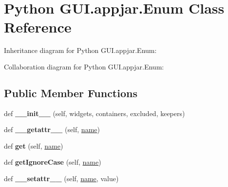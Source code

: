 \hypertarget{class_python_01_g_u_i_1_1appjar_1_1_enum}{}\section{Python G\+U\+I.\+appjar.\+Enum Class Reference}
\label{class_python_01_g_u_i_1_1appjar_1_1_enum}


Inheritance diagram for Python G\+U\+I.\+appjar.\+Enum\+:


Collaboration diagram for Python G\+U\+I.\+appjar.\+Enum\+:
\subsection*{Public Member Functions}
\begin{DoxyCompactItemize}
\item 
\mbox{\label{class_python_01_g_u_i_1_1appjar_1_1_enum_a0cd33a72c16b6d68471f55c382edd94d}} 
def {\bfseries \+\_\+\+\_\+init\+\_\+\+\_\+} (self, widgets, containers, excluded, keepers)
\item 
\mbox{\label{class_python_01_g_u_i_1_1appjar_1_1_enum_ae4a3d992ee00309f0f13fff623215ea0}} 
def {\bfseries \+\_\+\+\_\+getattr\+\_\+\+\_\+} (self, \hyperlink{class_python_01_g_u_i_1_1appjar_1_1_enum_a272c5483812543eeffcb4ab15822a467}{name})
\item 
\mbox{\label{class_python_01_g_u_i_1_1appjar_1_1_enum_a3652f593bd052b6699ebc9715b37d047}} 
def {\bfseries get} (self, \hyperlink{class_python_01_g_u_i_1_1appjar_1_1_enum_a272c5483812543eeffcb4ab15822a467}{name})
\item 
\mbox{\label{class_python_01_g_u_i_1_1appjar_1_1_enum_ae332fc6037fe96886585f856ace527d2}} 
def {\bfseries get\+Ignore\+Case} (self, \hyperlink{class_python_01_g_u_i_1_1appjar_1_1_enum_a272c5483812543eeffcb4ab15822a467}{name})
\item 
\mbox{\label{class_python_01_g_u_i_1_1appjar_1_1_enum_af3eaf04edc15e9b14470bb84dfa4dfa6}} 
def {\bfseries \+\_\+\+\_\+setattr\+\_\+\+\_\+} (self, \hyperlink{class_python_01_g_u_i_1_1appjar_1_1_enum_a272c5483812543eeffcb4ab15822a467}{name}, value)

\end{DoxyCompactItemize}
